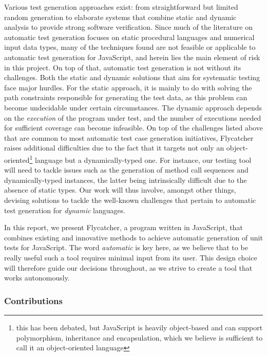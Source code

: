 Various test generation approaches exist: from straightforward but limited random generation to elaborate systems that combine static and dynamic analysis to provide strong software verification. Since much of the literature on automatic test generation focuses on static procedural languages and numerical input data types, many of the techniques found are not feasible or applicable to automatic test generation for JavaScript, and herein lies the main element of risk in this project. On top of that, automatic test generation is not without its challenges. Both the static and dynamic solutions that aim for systematic testing face major hurdles. For the static approach, it is mainly to do with solving the path constraints responsible for generating the test data, as this problem can become undecidable under certain circumstances. The dynamic approach depends on the \emph{execution} of the program under test, and the number of executions needed for sufficient coverage can become infeasible. On top of the challenges listed above that are common to most automatic test case generation initiatives, \textsf{Flycatcher} raises additional difficulties due to the fact that it targets not only an object-oriented\footnote{this has been debated, but JavaScript is heavily object-based and can support polymorphism, inheritance and encapsulation, which we believe is sufficient to call it an object-oriented language} language but a dynamically-typed one. For instance, our testing tool will need to tackle issues such as the generation of method call sequences and dynamically-typed instances, the latter being intrinsically difficult due to the absence of static types. Our work will thus involve, amongst other things, devising solutions to tackle the well-known challenges that pertain to automatic test generation for \emph{dynamic} languages.

In this report, we present \textsf{Flycatcher}, a program written in JavaScript, that combines existing and innovative methods to achieve automatic generation of unit tests for JavaScript. The word \emph{automatic} is key here, as we believe that to be really useful such a tool requires minimal input from its user. This design choice will therefore guide our decisions throughout, as we strive to create a tool that works autonomously.
\subsubsection{Contributions}

